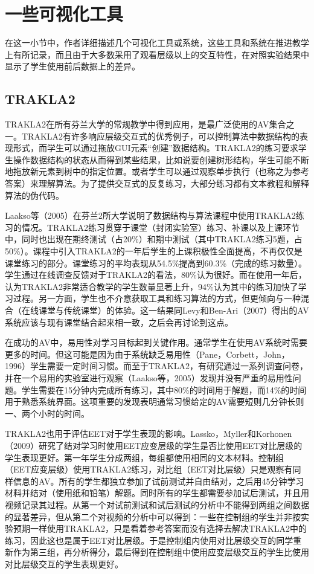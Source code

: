 \chapter{一些可视化工具}
\begin{sectext}
在这一小节中，作者详细描述几个可视化工具或系统，这些工具和系统在推进教学上有所记录，而且由于大多数采用了观看层级以上的交互特性，在对照实验结果中显示了学生使用前后数据上的差异。
\end{sectext}
\section{TRAKLA2}
\begin{sectext}
TRAKLA2在所有芬兰大学的常规教学中得到应用，是最广泛使用的AV集合之一。TRAKLA2有许多响应层级交互式的优秀例子，可以控制算法中数据结构的表现形式，而学生可以通过拖放GUI元素``创建''数据结构。TRAKLA2的练习要求学生操作数据结构的状态从而得到某些结果，比如说要创建树形结构，学生可能不断地拖放新元素到树中的指定位置。或者学生可以通过观察单步执行（也称之为参考答案）来理解算法。为了提供交互式的反复练习，大部分练习都有文本教程和解释算法的伪代码。

Laakso等（2005）在芬兰2所大学说明了数据结构与算法课程中使用TRAKLA2练习的情况。TRAKLA2练习贯穿于课堂（封闭实验室）练习、补课以及上课环节中，同时也出现在期终测试（占20\%）和期中测试（其中TRAKLA2练习5题，占50\%）。课程中引入TRAKLA2的一年后学生的上课积极性全面提高，不再仅仅是课堂练习的部分。课堂练习的平均表现从54.5\%提高到60.3\%（完成的练习数量）。学生通过在线调查反馈对于TRAKLA2的看法，80\%认为很好。而在使用一年后，认为TRAKLA2非常适合教学的学生数量显著上升，94\%认为其中的练习加快了学习过程。另一方面，学生也不介意获取工具和练习算法的方式，但更倾向与一种混合（在线课堂与传统课堂）的体验。这一结果同Levy和Ben-Ari（2007）得出的AV系统应该与现有课堂结合起来相一致，之后会再讨论到这点。

在成功的AV中，易用性对学习目标起到关键作用。通常学生在使用AV系统时需要更多的时间。但这可能是因为由于系统缺乏易用性（Pane，Corbett，John，1996）学生需要一定时间习惯。而至于TRAKLA2，有研究通过一系列调查问卷，并在一个易用的实验室进行观察（Laakso等，2005）发现并没有严重的易用性问题。学生需要在15分钟内完成所有练习，其中80\%的时间用于解题，而14\%的时间用于熟悉系统界面。这项重要的发现表明通常习惯给定的AV需要短则几分钟长则一、两个小时的时间。

TRAKLA2也用于评估EET对于学生表现的影响。Lassko，Myller和Korhonen（2009）研究了结对学习时使用EET应变层级的学生是否比使用EET对比层级的学生表现更好。第一年学生分成两组，每组都使用相同的文本材料。控制组（EET应变层级）使用TRAKLA2练习，对比组（EET对比层级）只是观察有同样信息的AV。所有的学生都独立参加了试前测试并自由结对，之后用45分钟学习材料并结对（使用纸和铅笔）解题。同时所有的学生都需要参加试后测试，并且用视频记录其过程。从第一个对试前测试和试后测试的分析中不能得到两组之间数据的显著差异，但从第二个对视频的分析中可以得到：一些在控制组的学生并非按实验预期一样使用TRAKLA2，只是看着参考答案而没有选择去解决TRAKLA2中的练习，因此这也是属于EET对比层级。于是控制组内使用对比层级交互的同学重新作为第三组，再分析得分，最后得到在控制组中使用应变层级交互的学生比使用对比层级交互的学生表现更好。
\end{sectext}
